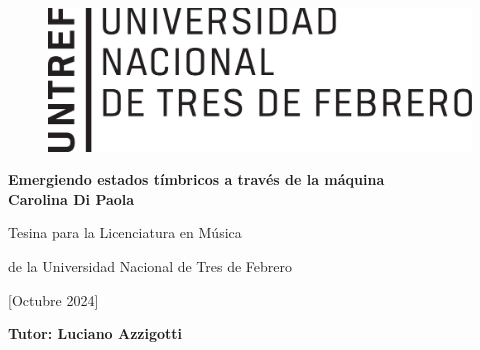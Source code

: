 \begin{titlepage}
	
	
	\begin{figure} [h!]
		\begin{flushright}
			\includegraphics[scale=0.40]{logo_untref}
		\end{flushright}
	\end{figure}
	
	\begin{center}
		
		\vspace{1cm}
		{\LARGE \textbf {Emergiendo estados tímbricos a través de la máquina}}\\
		\vspace{2cm}
		{\large \textbf {Carolina Di Paola}}
		
		\vspace{11cm}
		
		{\Large Tesina para la Licenciatura en Música}
		
		{\Large de la Universidad Nacional de Tres de Febrero}
		
		{\Large [Octubre 2024]}
		\vspace{1cm}
		
		{\Large \textbf{Tutor: Luciano Azzigotti}}
	\end{center}
\end{titlepage}
